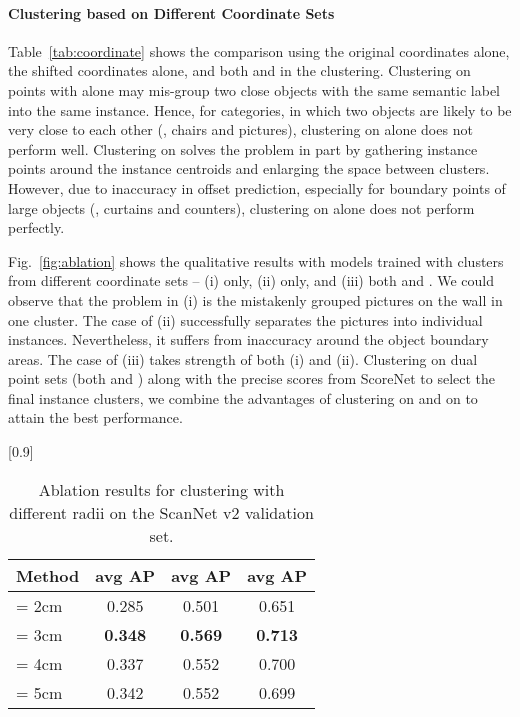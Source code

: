\documentclass[10pt,twocolumn,letterpaper]{article}
\begin{document}
\vspace*{-3mm}
\paragraph{Clustering based on Different Coordinate Sets}
Table~\ref{tab:coordinate} shows the comparison using the original coordinates  alone, the shifted coordinates  alone, and both  and  in the clustering.
Clustering on points with  alone may mis-group two close objects with the same semantic label into the same instance. Hence, for categories, in which two objects are likely to be very close to each other (\eg, chairs and pictures), clustering on  alone does not perform well.  
Clustering on  solves the problem in part by gathering instance points around the instance centroids and enlarging the space between clusters.  
However, due to inaccuracy in offset prediction, especially for boundary points of large objects (\eg, curtains and counters), clustering on  alone does not perform perfectly.
  
Fig.~\ref{fig:ablation} shows the qualitative results with models trained with clusters from different coordinate sets -- (i)  only, (ii)  only, and (iii) both  and . We could observe that the problem in (i) is the mistakenly grouped pictures on the wall in one cluster. The case of (ii)
successfully separates the pictures into individual instances.  Nevertheless, it suffers from inaccuracy around the object boundary areas. The case of (iii) takes strength of both (i) and (ii). 
Clustering on dual point sets (both  and ) along with the precise scores from ScoreNet to select the final instance clusters, we combine the advantages of clustering on  and on  to attain the best performance.

\begin{table}
	\vspace*{-0.5mm}
	\begin{center}
		\scalebox{0.85}[0.9]{
			\begin{tabular}{l | c c c}
				\hline
				Method & avg AP & avg AP & avg AP \\
				\hline
				 = 2cm & 0.285 & 0.501 & 0.651 \\
				 = 3cm & \textbf{0.348} & \textbf{0.569} & \textbf{0.713} \\
				 = 4cm & 0.337 & 0.552 & 0.700 \\
				 = 5cm & 0.342 & 0.552 & 0.699 \\
				\hline
			\end{tabular}
		}
	\end{center}
	\vspace{-4mm}
	\caption{Ablation results for clustering with different radii  on the ScanNet v2 validation set.}
	\label{tab:radius}
\end{table}
\end{document}
